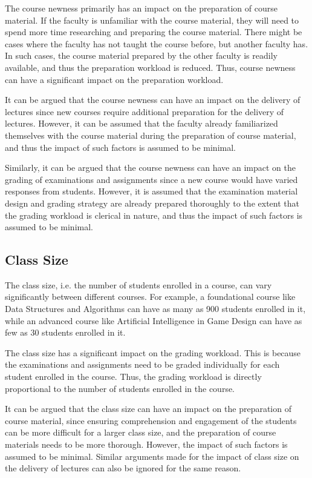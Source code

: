The course newness primarily has an impact on the preparation of course material. If the faculty is unfamiliar with the course material, they will need to spend more time researching and preparing the course material. There might be cases where the faculty has not taught the course before, but another faculty has. In such cases, the course material prepared by the other faculty is readily available, and thus the preparation workload is reduced. Thus, course newness can have a significant impact on the preparation workload.

It can be argued that the course newness can have an impact on the delivery of lectures since new courses require additional preparation for the delivery of lectures. However, it can be assumed that the faculty already familiarized themselves with the course material during the preparation of course material, and thus the impact of such factors is assumed to be minimal.

Similarly, it can be argued that the course newness can have an impact on the grading of examinations and assignments since a new course would have varied responses from students. However, it is assumed that the examination material design and grading strategy are already prepared thoroughly to the extent that the grading workload is clerical in nature, and thus the impact of such factors is assumed to be minimal.

\subsection{Class Size}

The class size, i.e. the number of students enrolled in a course, can vary significantly between different courses. For example, a foundational course like Data Structures and Algorithms can have as many as 900 students enrolled in it, while an advanced course like Artificial Intelligence in Game Design can have as few as 30 students enrolled in it.

The class size has a significant impact on the grading workload. This is because the examinations and assignments need to be graded individually for each student enrolled in the course. Thus, the grading workload is directly proportional to the number of students enrolled in the course.

It can be argued that the class size can have an impact on the preparation of course material, since ensuring comprehension and engagement of the students can be more difficult for a larger class size, and the preparation of course materials needs to be more thorough. However, the impact of such factors is assumed to be minimal. Similar arguments made for the impact of class size on the delivery of lectures can also be ignored for the same reason.


